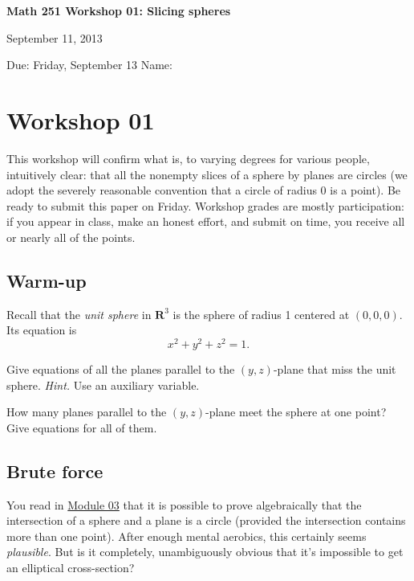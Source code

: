 \documentclass[12pt]{exam}
\theoremstyle{definition}
\begin{document}
\lstset{language=R}
\noindent
\textbf{{\large Math 251 \hfill Workshop 01: Slicing spheres}}

\noindent
September 11, 2013 

\noindent
Due: Friday, September 13 \hfill Name: \underline{\hspace{3in}} 

\noindent

\section{Workshop 01}

This workshop will confirm what is, to varying degrees for various
people, intuitively clear: that all the nonempty slices of a sphere by
planes are circles (we adopt the severely reasonable convention that a
circle of radius 0 is a point). Be ready to submit this paper on Friday.
Workshop grades are mostly participation: if you appear in class, make
an honest effort, and submit on time, you receive all or nearly all of
the points.

\subsection{Warm-up}

Recall that the \emph{unit sphere} in $\mathbf{R}^3$ is the sphere of
radius 1 centered at $(0,0,0)$. Its equation is
\[ x^2 + y^2 + z^2 = 1. \]

\begin{questions}

\question Give equations of all the planes parallel to the $(y,z)$-plane that miss the unit sphere. \emph{Hint.} Use an auxiliary variable.

\question How many planes parallel to the $(y,z)$-plane meet the sphere at one point? Give equations for all of them.
 
\end{questions}

\subsection{Brute force}

You read in \href{../../Modules/03/Module.html}{Module 03} that it is
possible to prove algebraically that the intersection of a sphere and a
plane is a circle (provided the intersection contains more than one
point). After enough mental aerobics, this certainly seems
\emph{plausible}. But is it completely, unambiguously obvious that it's
impossible to get an elliptical cross-section?
\end{document}

